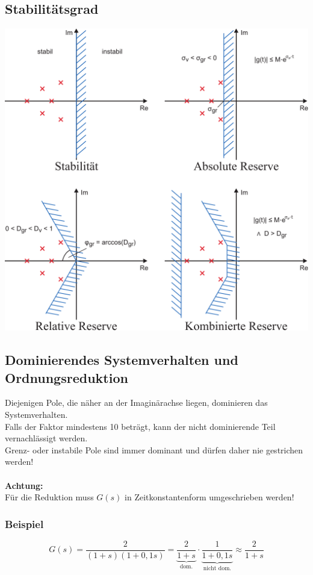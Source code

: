 \documentclass[a4paper,twocolumn,10pt]{article}
\begin{document}
\subsection{Stabilitätsgrad}
\begin{center}
\includegraphics[width=0.95\columnwidth]{Grafiken/Stabilitaetsreserven}
\end{center}

\subsection{Dominierendes Systemverhalten und Ordnungsreduktion}
Diejenigen Pole, die näher an der Imaginärachse liegen, dominieren das Systemverhalten.\\
Falls der Faktor mindestens 10 beträgt, kann der nicht dominierende Teil vernachlässigt werden.\\
Grenz- oder instabile Pole sind immer dominant und dürfen daher nie gestrichen werden!\\\\
\textbf{Achtung:}\\
Für die Reduktion muss $G(s)$ in Zeitkonstantenform umgeschrieben werden!

\subsubsection{Beispiel}
\begin{equation*}
G(s)=\frac{2}{(1+s)(1+0,1s)}=\underbrace{\frac{2}{1+s}}_{\text{dom.}}\cdot\underbrace{\frac{1}{1+0,1s}}_{\text{nicht dom.}}\approx\frac{2}{1+s}
\end{equation*}
\end{document}
